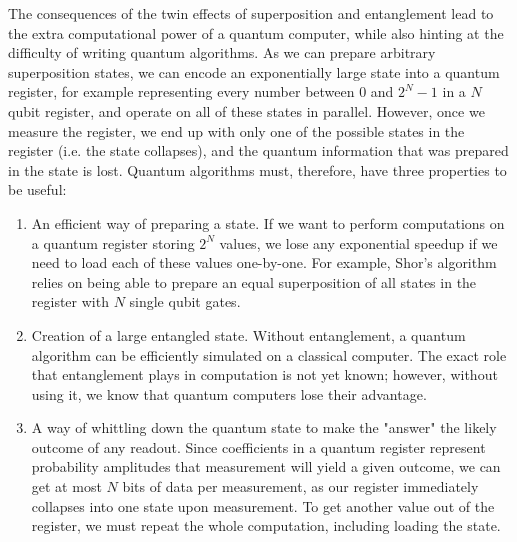 The consequences of the twin effects of superposition and entanglement lead to the extra computational
power of a quantum computer, while also hinting at the difficulty of writing quantum algorithms. As we
can prepare arbitrary superposition states, we can encode an exponentially large
state into a quantum register, for example representing every number between 0 and $2^N-1$ in a $N$ qubit
register, and operate on all of these states in parallel. However, once we measure the register, we end up 
with only one of the possible states in the register (i.e. the state collapses), and the quantum information
that was prepared in the state is lost. Quantum algorithms must, therefore, have three properties to be useful:
\begin{enumerate}
  \item An efficient way of preparing a state. If we want to perform computations on a quantum register 
    storing $2^N$ values, we lose any exponential speedup if we need to load each of these values one-by-one. 
    For example, Shor's algorithm relies on being able to prepare an equal superposition of all states 
    in the register with $N$ single qubit gates\cite{PhysRevA.54.1034}.
  \item Creation of a large entangled state. Without entanglement, a quantum algorithm can be efficiently 
    simulated on a classical computer. The exact role that entanglement plays in computation is not yet known; 
    however, without using it, we know that quantum computers lose their advantage\cite{doi:10.1098/rspa.2002.1097}.
  \item A way of whittling down the quantum state to make the "answer" the likely outcome of any readout. 
    Since coefficients in a quantum register represent probability amplitudes that measurement will yield 
    a given outcome, we can get at most $N$ bits of data per measurement\cite{651037}, as our register 
    immediately collapses into one state upon measurement. To get another value out of the register, 
    we must repeat the whole computation, including loading the state.
\end{enumerate}


